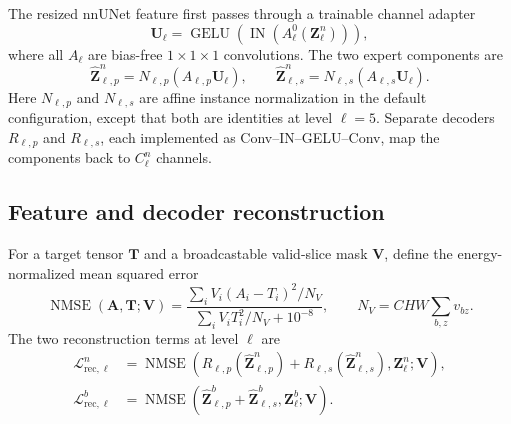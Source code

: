 \documentclass[10pt]{article}
\newcommand{\cL}{\mathcal{L}}
\begin{document}
The resized nnUNet feature first passes through a trainable channel adapter
\begin{equation}
    \bm{U}_{\ell}
    =\operatorname{GELU}\!\left(
       \operatorname{IN}\!\left(A^0_\ell(\bm{Z}^{n}_{\ell})\right)
     \right),
\end{equation}
where all $A_\ell$ are bias-free $1\!\times\!1\!\times\!1$ convolutions.
The two expert components are
\begin{equation}
    \widehat{\bm{Z}}^{n}_{\ell,p}=N_{\ell,p}(A_{\ell,p}\bm{U}_{\ell}),
    \qquad
    \widehat{\bm{Z}}^{n}_{\ell,s}=N_{\ell,s}(A_{\ell,s}\bm{U}_{\ell}).
    \label{eq:expert-decomposition}
\end{equation}
Here $N_{\ell,p}$ and $N_{\ell,s}$ are affine instance normalization in the
default configuration, except that both are identities at level $\ell=5$.
Separate decoders $R_{\ell,p}$ and $R_{\ell,s}$, each implemented as
Conv--IN--GELU--Conv, map the components back to $C^n_\ell$ channels.

\subsection{Feature and decoder reconstruction}

For a target tensor $\bm{T}$ and a broadcastable valid-slice mask $\bm{V}$,
define the energy-normalized mean squared error
\begin{equation}
    \operatorname{NMSE}(\bm{A},\bm{T};\bm{V})
    =
    \frac{
      \sum_i V_i(A_i-T_i)^2/N_V
    }{
      \sum_i V_iT_i^2/N_V+10^{-8}
    },
    \qquad
    N_V=C H W\sum_{b,z}v_{bz}.
    \label{eq:nmse}
\end{equation}
The two reconstruction terms at level $\ell$ are
\begin{align}
    \cL^{n}_{\mathrm{rec},\ell}
    &={\operatorname{NMSE}}\!\left(
      R_{\ell,p}(\widehat{\bm{Z}}^{n}_{\ell,p})
      +R_{\ell,s}(\widehat{\bm{Z}}^{n}_{\ell,s}),
      \bm{Z}^{n}_{\ell};\bm{V}\right),\\
    \cL^{b}_{\mathrm{rec},\ell}
    &={\operatorname{NMSE}}\!\left(
      \widehat{\bm{Z}}^{b}_{\ell,p}
      +\widehat{\bm{Z}}^{b}_{\ell,s},
      \bm{Z}^{b}_{\ell};\bm{V}\right).
    \label{eq:level-reconstruction}
\end{align}
\end{document}
